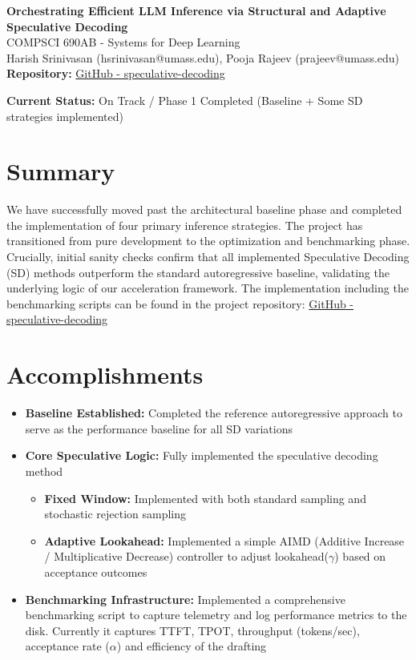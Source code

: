 \documentclass[11pt]{article}
\begin{document}
\begin{center}
{\Large \textbf{Orchestrating Efficient LLM Inference via Structural and Adaptive
Speculative Decoding}}\\[7pt]
COMPSCI 690AB - Systems for Deep Learning\\[4pt]
Harish Srinivasan (hsrinivasan@umass.edu), Pooja Rajeev (prajeev@umass.edu) \\
\noindent\textbf{Repository:} \href{https://github.com/Sykarius/speculative-decoding}{GitHub - speculative-decoding}
\end{center}


\noindent\textbf{Current Status:} On Track / Phase 1 Completed (Baseline + Some SD strategies implemented)
\section{Summary}
We have successfully moved past the architectural baseline phase and completed the implementation of four primary inference strategies. 
The project has transitioned from pure development to the optimization and benchmarking phase. 
Crucially, initial sanity checks confirm that all implemented Speculative Decoding (SD) methods outperform the standard autoregressive baseline, validating the underlying logic of our acceleration framework.
The implementation including the benchmarking scripts can be found in the project repository: \href{https://github.com/Sykarius/speculative-decoding}{GitHub - speculative-decoding}

\section{Accomplishments}
\begin{itemize}
    \item \textbf{Baseline Established:} Completed the reference autoregressive approach to serve
    as the performance baseline for all SD variations
    \item \textbf{Core Speculative Logic:} Fully implemented the speculative decoding method
    \begin{itemize}
        \item \textbf{Fixed Window:} Implemented with both standard sampling \cite{leviathan2023} and stochastic rejection sampling \cite{leviathan2023}
        \item \textbf{Adaptive Lookahead:} Implemented a simple AIMD \cite{chiu1989analysis} (Additive Increase / Multiplicative Decrease) controller to adjust lookahead($\gamma$) based on acceptance outcomes
    \end{itemize}
    \item \textbf{Benchmarking Infrastructure:} Implemented a comprehensive benchmarking script to capture telemetry and log performance metrics to the disk. Currently it captures TTFT, TPOT, throughput (tokens/sec), acceptance rate ($\alpha$) and efficiency of the drafting
\end{itemize}
\end{document}
